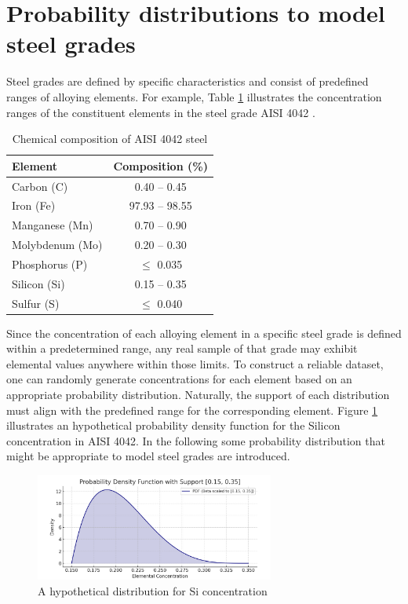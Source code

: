 \documentclass[12pt,a4paper]{article}
\begin{document}
	\section{Probability distributions to model steel grades} \label{h:Probability distributions}
	Steel grades are defined by specific characteristics and consist of predefined ranges of alloying elements. For example, Table \ref{table:aisi4042} illustrates the concentration ranges of the constituent elements in the steel grade AISI 4042 \cite{matweb2025}.  
	\begin{table}[h!]
		\centering
		\caption{Chemical composition of AISI 4042 steel}
		\begin{tabular}{|l|c|}
			
			\hline
			\textbf{Element} & \textbf{Composition (\%)} \\ \hline
			Carbon (C)       & 0.40 – 0.45 \\ \hline
			Iron (Fe)        & 97.93 – 98.55 \\ \hline
			Manganese (Mn)   & 0.70 – 0.90 \\ \hline
			Molybdenum (Mo)  & 0.20 – 0.30 \\ \hline
			Phosphorus (P)   & $\leq$ 0.035 \\ \hline
			Silicon (Si)     & 0.15 – 0.35 \\ \hline
			Sulfur (S)       & $\leq$ 0.040 \\ \hline
		\end{tabular}
				\label{table:aisi4042}
	\end{table}	
	Since the concentration of each alloying element in a specific steel grade is defined within a predetermined range, any real sample of that grade may exhibit elemental values anywhere within those limits. To construct a reliable dataset, one can randomly generate concentrations for each element based on an appropriate probability distribution. Naturally, the support of each distribution must align with the predefined range for the corresponding element. Figure \ref{fig:prob_dens} illustrates an hypothetical probability density function for the Silicon concentration in AISI 4042. In the following some probability distribution that might be appropriate to model steel grades are introduced.
	\begin{figure}[h!]
		\centering
		\includegraphics[width=0.7\textwidth]{Prob_dens.png}
		\caption{A hypothetical distribution for Si concentration}
		\label{fig:prob_dens}
	\end{figure}
\end{document}
